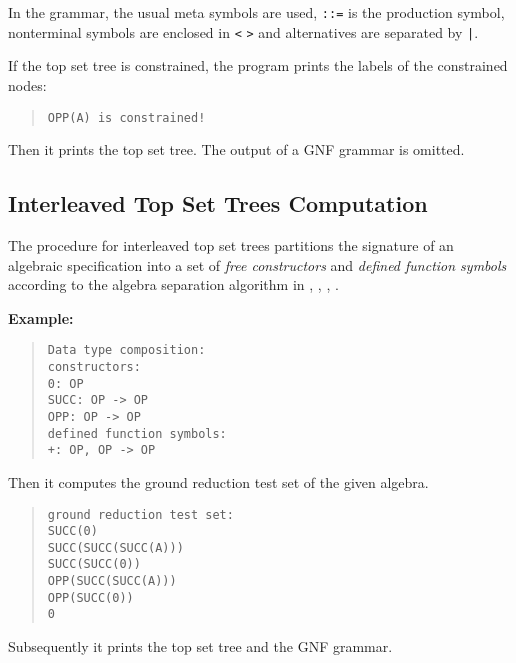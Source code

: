 In the grammar, the usual meta symbols are used, {\tt ::=} is the
production symbol, nonterminal symbols are enclosed in \verb+<+ \verb+>+ and 
alternatives are separated by \verb+|+.

If the top set tree is constrained, the program prints the labels of
the constrained nodes:
\begin{quote}
\begin{verbatim}
OPP(A) is constrained!
\end{verbatim}
\end{quote}
Then it prints the top set tree. The output of a GNF grammar is omitted.

\subsection{Interleaved Top Set Trees Computation}
\label{InterleavedTopSetTrees}
The procedure for interleaved top set trees partitions the signature of an 
algebraic
specification into a set of {\em free constructors} and {\em defined function
symbols} according to the algebra separation algorithm in 
\cite{BuendgenKuechlin:89}, \cite{Buendgen:91b}, \cite{Eckhardt:91},
\cite{BuendgenEckhardt:92}.

\noindent
{\bf Example:}
\begin{quote}
\begin{verbatim}
Data type composition:
constructors: 
0: OP
SUCC: OP -> OP
OPP: OP -> OP
defined function symbols: 
+: OP, OP -> OP
\end{verbatim}
\end{quote}

Then it computes the ground reduction test set of the given algebra.
\begin{quote}
\begin{verbatim}
ground reduction test set: 
SUCC(0)
SUCC(SUCC(SUCC(A)))
SUCC(SUCC(0))
OPP(SUCC(SUCC(A)))
OPP(SUCC(0))
0
\end{verbatim}
\end{quote}

Subsequently it prints the top set tree and the GNF grammar.
